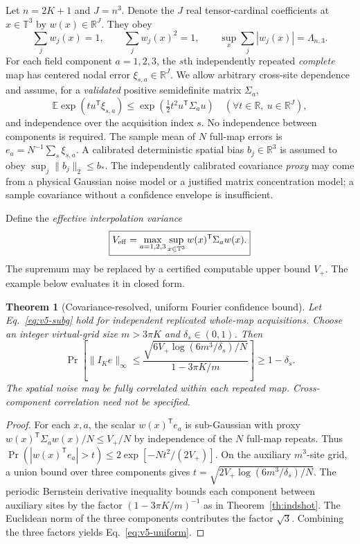 \documentclass[aps,prd,onecolumn,notitlepage,11pt,superscriptaddress,longbibliography]{revtex4-2}
\newtheorem{theorem}{Theorem}
\begin{document}
Let $n=2K+1$ and $J=n^3$. Denote the $J$ real tensor-cardinal coefficients at $x\in\mathbb T^3$ by $w(x)\in\mathbb R^J$. They obey
\begin{equation}\label{eq:v5-frame}
\sum_j w_j(x)=1,\qquad \sum_j w_j(x)^2=1,\qquad
\sup_x\sum_j|w_j(x)|=\Lambda_{n,3}.
\end{equation}
For each field component $a=1,2,3$, the $s$th independently repeated \emph{complete} map has centered nodal error $\xi_{s,a}\in\mathbb R^J$. We allow arbitrary cross-site dependence and assume, for a \emph{validated} positive semidefinite matrix $\Sigma_a$,
\begin{equation}\label{eq:v5-subg}
\mathbb E\exp(tu^\mathsf T\xi_{s,a})
 \le\exp\!\left(\tfrac12 t^2 u^\mathsf T\Sigma_a u\right)
\quad(\forall t\in\mathbb R,\ u\in\mathbb R^J),
\end{equation}
and independence over the acquisition index $s$. No independence between components is required. The sample mean of $N$ full-map errors is $e_a=N^{-1}\sum_s\xi_{s,a}$. A calibrated deterministic spatial bias $b_j\in\mathbb R^3$ is assumed to obey $\sup_j\|b_j\|_2\le b_*$. The independently calibrated covariance \emph{proxy} may come from a physical Gaussian noise model or a justified matrix concentration model; a sample covariance without a confidence envelope is insufficient.

Define the \emph{effective interpolation variance}
\begin{equation}\label{eq:v5-V}
\boxed{V_{\rm eff}=\max_{a=1,2,3}\sup_{x\in\mathbb T^3}
                w(x)^\mathsf T\Sigma_a w(x).}
\end{equation}
The supremum may be replaced by a certified computable upper bound $V_+$. The example below evaluates it in closed form.

\begin{theorem}[Covariance-resolved, uniform Fourier confidence bound]\label{th:v5-correlated}
Let Eq.~\eqref{eq:v5-subg} hold for independent replicated whole-map acquisitions. Choose an integer virtual-grid size $m>3\pi K$ and $\delta_s\in(0,1)$. Then
\begin{equation}\label{eq:v5-uniform}
\boxed{\Pr\!\left[
\|I_K e\|_\infty
\le \frac{\sqrt{6V_+\log(6m^3/\delta_s)/N}}{1-3\pi K/m}
\right]\ge1-\delta_s.}
\end{equation}
The spatial noise may be fully correlated within each repeated map. Cross-component correlation need not be specified.
\end{theorem}
\begin{proof}
For each $x,a$, the scalar $w(x)^\mathsf Te_a$ is sub-Gaussian with proxy $w(x)^\mathsf T\Sigma_aw(x)/N\le V_+/N$ by independence of the $N$ full-map repeats. Thus
$\Pr(|w(x)^\mathsf Te_a|>t)\le2\exp[-Nt^2/(2V_+)]$.
On the auxiliary $m^3$-site grid, a union bound over three components gives
$t=\sqrt{2V_+\log(6m^3/\delta_s)/N}$.
The periodic Bernstein derivative inequality bounds each component between auxiliary sites by the factor $(1-3\pi K/m)^{-1}$ as in Theorem~\ref{th:indshot}. The Euclidean norm of the three components contributes the factor $\sqrt3$. Combining the three factors yields Eq.~\eqref{eq:v5-uniform}.
\end{proof}
\end{document}
